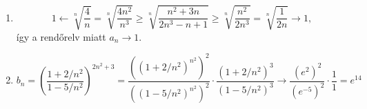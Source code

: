 \documentclass[11pt]{scrartcl}
\begin{document}
\begin{enumerate}
	\item \[
		      1 \leftarrow \sqrt[n]{\frac{4}{n}}
		      = \sqrt[n]{\frac{4n^2}{n^3}}
		      \ge \sqrt[n]{\frac{n^2 + 3n}{2n^3 - n + 1}}
		      \ge \sqrt[n]{\frac{n^2}{2n^3}}
		      = \sqrt[n]{\frac{1}{2n}} \to 1,
	      \]
	      így a rendőrelv miatt $a_n \to 1$.

	\item \[
		      b_n
		      = \left( \frac{1 + 2/n^2}{1 - 5/n^2} \right)^{2n^2 + 3}
		      =
		      \frac{\left( \left(1 + 2/n^2\right)^{n^2} \right)^2}{\left( \left(1 - 5/n^2\right)^{n^2} \right)^2}
		      \cdot \frac{\left(1 + 2/n^2\right)^3}{\left(1 - 5/n^2\right)^3}
		      \longrightarrow
		      \frac{\left(e^2\right)^2}{\left(e^{-5}\right)^2} \cdot \frac{1}{1}
		      = e^{14}
	      \]
\end{enumerate}
\end{document}
